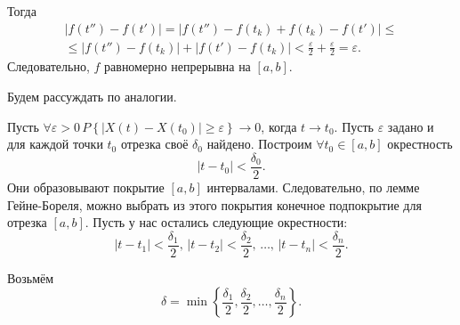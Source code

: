Тогда
\begin{gather*}
  \left| f \left( t'' \right) - f \left( t' \right) \right| =
  \left|
    f \left( t'' \right) - f \left( t_k \right) + f \left( t_k \right) - f \left( t' \right)
  \right| \leq \\
  \leq \left| f \left( t'' \right) - f \left( t_k \right) \right| +
  \left| f \left( t' \right) - f \left( t_k \right) \right| <
  \frac{ \varepsilon }{2} + \frac{ \varepsilon }{2} =
  \varepsilon.
\end{gather*}
Следовательно,  $f$ равномерно непрерывна на $ \left[ a, b \right] $.

Будем рассуждать по аналогии.

Пусть
$ \forall \varepsilon > 0 \,
  P \left\{ \left| X \left( t \right) - X \left( t_0 \right) \right| \geq \varepsilon \right\} \to
  0$,
когда $t \to t_0$.
Пусть $ \varepsilon $ задано и для каждой точки $t_0$ отрезка своё $ \delta_0 $ найдено.
Построим $ \forall t_0 \in \left[ a, b \right] $ окрестность
\begin{equation*}
  \left| t - t_0 \right| <
  \frac{ \delta_0}{2}.
\end{equation*}
Они образовывают покрытие $ \left[ a, b \right] $ интервалами.
Следовательно, по лемме Гейне-Бореля,
можно выбрать из этого покрытия конечное подпокрытие для отрезка $ \left[ a, b \right] $.
Пусть у нас остались следующие окрестности:
\begin{equation*}
  \left| t - t_1 \right| < \frac{ \delta_1}{2}, \,
  \left| t - t_2 \right| < \frac{ \delta_2}{2}, \,
  \dotsc, \,
  \left| t - t_n \right| < \frac{ \delta_n}{2}.
\end{equation*}

Возьмём
\begin{equation*}
  \delta =
  \min \left\{ \frac{ \delta_1}{2}, \frac{ \delta_2}{2}, \dotsc, \frac{ \delta_n}{2} \right\}.
\end{equation*}

